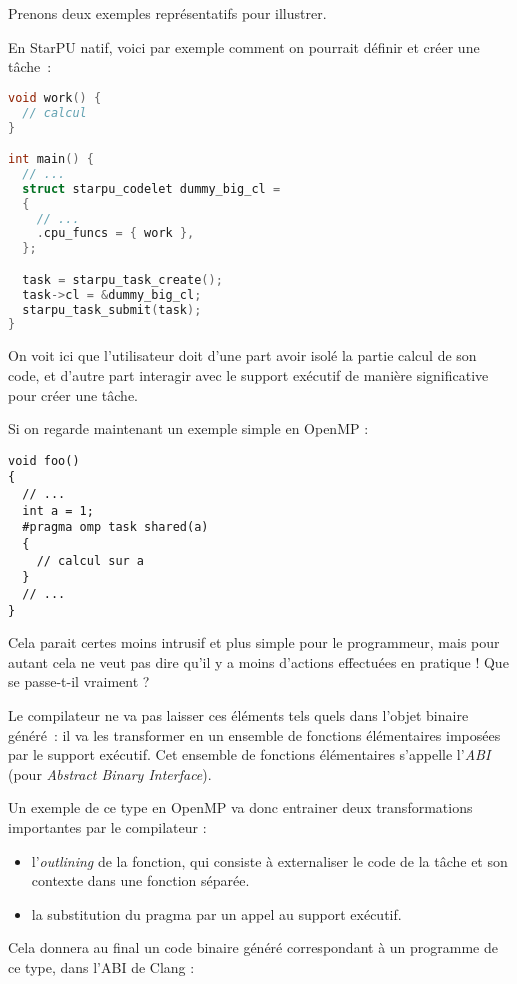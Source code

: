 Prenons deux exemples représentatifs pour illustrer.

En StarPU natif, voici par exemple comment on pourrait définir et créer une tâche~:

\begin{lstlisting}[language=c++,caption=Exemple simple en StarPU,label=lst:context:simple-starpu]
void work() {
  // calcul
}

int main() {
  // ...
  struct starpu_codelet dummy_big_cl =
  {
    // ...
    .cpu_funcs = { work },
  };

  task = starpu_task_create();
  task->cl = &dummy_big_cl;
  starpu_task_submit(task);
}
\end{lstlisting}

On voit ici que l'utilisateur doit d'une part avoir isolé la partie calcul de son code, et d'autre part interagir avec le support exécutif de manière significative pour créer une tâche.

Si on regarde maintenant un exemple simple en OpenMP :

\begin{lstlisting}
void foo()
{
  // ...
  int a = 1;
  #pragma omp task shared(a)
  {
    // calcul sur a
  }
  // ...
}
\end{lstlisting}

Cela parait certes moins intrusif et plus simple pour le programmeur, mais pour autant cela ne veut pas dire qu'il y a moins d'actions effectuées en pratique !
Que se passe-t-il vraiment ?

Le compilateur ne va pas laisser ces éléments tels quels dans l'objet binaire généré~: il va les transformer en un ensemble de fonctions élémentaires imposées par le support exécutif. Cet ensemble de fonctions élémentaires s'appelle l'\emph{ABI} (pour \emph{Abstract Binary Interface}).

Un exemple de ce type en OpenMP va donc entrainer deux transformations importantes par le compilateur :
\begin{itemize}
  \item l'\emph{outlining} de la fonction, qui consiste à externaliser le code de la tâche et son contexte dans une fonction séparée.
  \item la substitution du pragma par un appel au support exécutif.
\end{itemize}

Cela donnera au final un code binaire généré correspondant à un programme de ce type, dans l'ABI de Clang :

